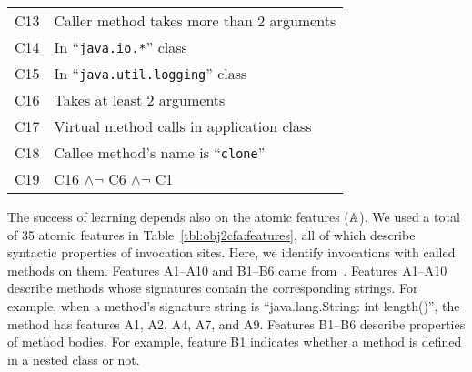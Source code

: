 \begin{table}[ht]
\begin{tabular}{ l l }
			C13 & Caller method takes more than 2 arguments \\
			C14 & In ``{\tt java.io.*}'' class\\
			C15 & In ``{\tt java.util.logging}'' class \\
			C16 & Takes at least 2 arguments\\
			C17 & Virtual method calls in application class \\
			C18 & Callee method's name is ``{\tt clone}''\\
			C19 & C16 $\land \neg$ C6 $\land \neg$ C1\\
			\bottomrule
		 \end{tabular}
	\end{table}




The success of learning depends also on the atomic features ($\mathbb{A}$). 
We used a total of 35 atomic features in Table~\ref{tbl:obj2cfa:features},
all of which describe syntactic properties of invocation sites. 
Here, we identify invocations with called methods on them.
Features A1--A10 and B1--B6 came from~\cite{JeJeOh18}. 
Features A1--A10 describe methods whose signatures 
contain the corresponding strings.
For example, when a method's signature string is ``java.lang.String: int length()'', the method has features A1, A2, A4, A7, and A9.
Features B1--B6 describe properties of method bodies. 
For example, feature B1 indicates whether a method is defined in a nested class or not.



